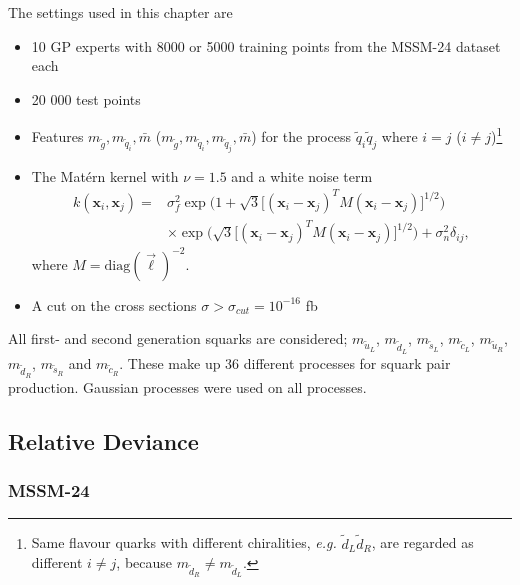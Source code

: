 \documentclass[twoside,english]{uiofysmaster}
\begin{document}
The settings used in this chapter are
\begin{itemize}
\item 10 GP experts with 8000 or 5000 training points from the MSSM-24 dataset each
\item 20 000 test points
\item Features $m_{\tilde{g}}, m_{\tilde{q}_i}, \bar{m}$ ($m_{\tilde{g}}, m_{\tilde{q}_i}, m_{\tilde{q}_j}, \bar{m}$) for the process $\tilde{q}_i \tilde{q}_j$ where $i=j$ ($i \neq j$)\footnote{Same flavour quarks with different chiralities, \textit{e.g.} $\tilde{d}_L \tilde{d}_R$, are regarded as different $i \neq j$, because $m_{\tilde{d}_{R}} \neq m_{\tilde{d}_L}$.}
\item The Mat\'{e}rn kernel with $\nu=1.5$ and a white noise term
\begin{align}
k (\textbf{x}_i, \textbf{x}_j) =& \sigma_f^2 \exp \Big( 1 + \sqrt{3} \big[ (\textbf{x}_i - \textbf{x}_j)^T M (\textbf{x}_i - \textbf{x}_j) \big]^{1/2} \Big)\\ & \times  \exp \Big( \sqrt{3} \big[ (\textbf{x}_i - \textbf{x}_j)^T M (\textbf{x}_i - \textbf{x}_j) \big]^{1/2} \Big) + \sigma_n^2 \delta_{ij},
\end{align}
where $M = \text{diag}(\vec{\ell})^{-2}$.
\item A cut on the cross sections $\sigma > \sigma_{cut} = 10^{-16}$ fb
\end{itemize}

All first- and second generation squarks are considered; $m_{\tilde{u}_L}$, $m_{\tilde{d}_L}$, $m_{\tilde{s}_L}$, $m_{\tilde{c}_L}$, $m_{\tilde{u}_R}$, $m_{\tilde{d}_R}$, $m_{\tilde{s}_R}$ and $m_{\tilde{c}_R}$. These make up 36 different processes for squark pair production. Gaussian processes were used on all processes.

\subsection{Relative Deviance}\label{Sec:: results : Relative Deviance}

\subsubsection{MSSM-24}
\end{document}
